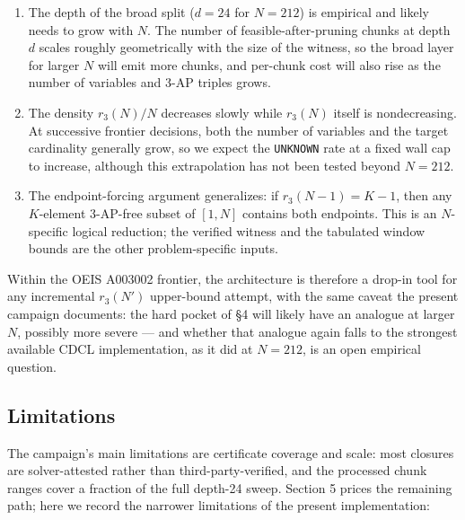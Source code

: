 \begin{enumerate}
\def\labelenumi{\arabic{enumi}.}
\tightlist
\item
  The depth of the broad split ($d = 24$ for $N = 212$) is empirical
  and likely needs to grow with $N$. The number of feasible-after-pruning
  chunks at depth $d$ scales roughly geometrically with the size of the
  witness, so the broad layer for larger $N$ will emit more chunks, and
  per-chunk cost will also rise as the number of variables and 3-AP triples
  grows.
\item
  The density $r_3(N)/N$ decreases slowly while $r_3(N)$ itself is
  nondecreasing. At successive frontier decisions, both the number of
  variables and the target cardinality generally grow, so we expect the
  \texttt{UNKNOWN} rate at a fixed wall cap to increase, although this
  extrapolation has not been tested beyond $N=212$.
\item
  The endpoint-forcing argument generalizes: if $r_3(N - 1) = K - 1$,
  then any $K$-element 3-AP-free subset of $[1, N]$ contains both
  endpoints. This is an $N$-specific logical reduction; the verified
  witness and the tabulated window bounds are the other problem-specific
  inputs.
\end{enumerate}

Within the OEIS A003002 frontier, the architecture is therefore a
drop-in tool for any incremental $r_3(N')$ upper-bound attempt, with
the same caveat the present campaign documents: the hard pocket of §4
will likely have an analogue at larger $N$, possibly more severe --- and
whether that analogue again falls to the strongest available CDCL
implementation, as it did at $N = 212$, is an open empirical question.

\subsection{Limitations}\label{limitations}

The campaign's main limitations are certificate coverage and scale:
most closures are solver-attested rather than third-party-verified, and
the processed chunk ranges cover a fraction of the full depth-24 sweep.
Section 5 prices the remaining path; here we record the narrower
limitations of the present implementation:

